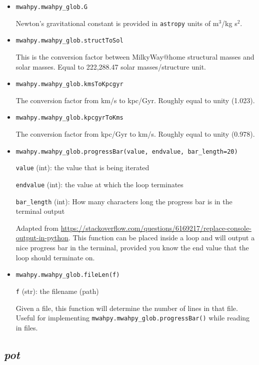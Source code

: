 \documentclass{article}
\begin{document}
\begin{itemize}

\item \verb!mwahpy.mwahpy_glob.G!

Newton's gravitational constant is provided in \verb!astropy! units of m$^3$/kg s$^2$.

\item \verb!mwahpy.mwahpy_glob.structToSol!

This is the conversion factor between MilkyWay@home structural masses and solar masses. Equal to 222,288.47 solar masses/structure unit.

\item \verb!mwahpy.mwahpy_glob.kmsToKpcgyr!

The conversion factor from km/s to kpc/Gyr. Roughly equal to unity (1.023).

\item \verb!mwahpy.mwahpy_glob.kpcgyrToKms!

The conversion factor from kpc/Gyr to km/s. Roughly equal to unity (0.978).


\item \verb!mwahpy.mwahpy_glob.progressBar(value, endvalue, bar_length=20)!

\verb!value! (int): the value that is being iterated

\verb!endvalue! (int): the value at which the loop terminates 

\verb!bar_length! (int): How many characters long the progress bar is in the terminal output

Adapted from \url{https://stackoverflow.com/questions/6169217/replace-console-output-in-python}. This function can be placed inside a loop and will output a nice progress bar in the terminal, provided you know the end value that the loop should terminate on. 

\item \verb!mwahpy.mwahpy_glob.fileLen(f)!

\verb!f! (str): the filename (path)

Given a file, this function will determine the number of lines in that file. Useful for implementing \verb!mwahpy.mwahpy_glob.progressBar()! while reading in files. 

\end{itemize} 

\subsection{\textit{pot}}
\end{document}
